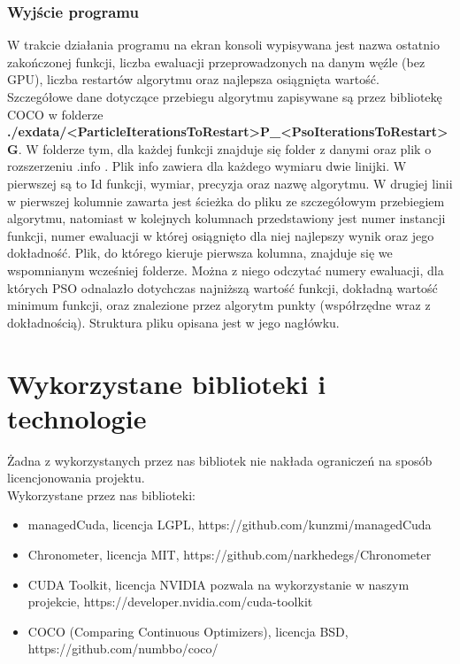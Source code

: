 \documentclass[12pt, twoside, openany, abstract=on]{report}
\theoremstyle{definition}
\begin{document}
\subsection{Wyjście programu}
W trakcie działania programu na ekran konsoli wypisywana jest nazwa ostatnio zakończonej funkcji, liczba ewaluacji przeprowadzonych na danym węźle (bez GPU), liczba restartów algorytmu oraz najlepsza osiągnięta wartość.\\

Szczegółowe dane dotyczące przebiegu algorytmu zapisywane są przez bibliotekę COCO w folderze \textbf{./exdata/<ParticleIterationsToRestart>P\_<PsoIterationsToRestart>G}. W folderze tym, dla każdej funkcji znajduje się folder z danymi oraz plik o rozszerzeniu .info . Plik info zawiera dla każdego wymiaru dwie linijki. W pierwszej są to Id funkcji, wymiar, precyzja oraz nazwę algorytmu. W drugiej linii w pierwszej kolumnie zawarta jest ścieżka do pliku ze szczegółowym przebiegiem algorytmu, natomiast w kolejnych kolumnach przedstawiony jest numer instancji funkcji, numer ewaluacji w której osiągnięto dla niej najlepszy wynik oraz jego dokładność. 
Plik, do którego kieruje pierwsza kolumna, znajduje się we wspomnianym wcześniej folderze. Można z niego odczytać numery ewaluacji, dla których PSO odnalazło dotychczas najniższą wartość funkcji, dokładną wartość minimum funkcji, oraz znalezione przez algorytm punkty (współrzędne wraz z dokładnością). Struktura pliku opisana jest w jego nagłówku. 


\chapter{Wykorzystane biblioteki i technologie}
Żadna z wykorzystanych przez nas bibliotek nie nakłada ograniczeń na sposób licencjonowania projektu. \\

Wykorzystane przez nas biblioteki:

\begin{itemize}
\item managedCuda, licencja LGPL, https://github.com/kunzmi/managedCuda
\item Chronometer, licencja MIT, https://github.com/narkhedegs/Chronometer
\item CUDA Toolkit, licencja NVIDIA pozwala na wykorzystanie w naszym projekcie, https://developer.nvidia.com/cuda-toolkit
\item COCO (Comparing Continuous Optimizers), licencja BSD, 
https://github.com/numbbo/coco/
\end{itemize}
\end{document}
